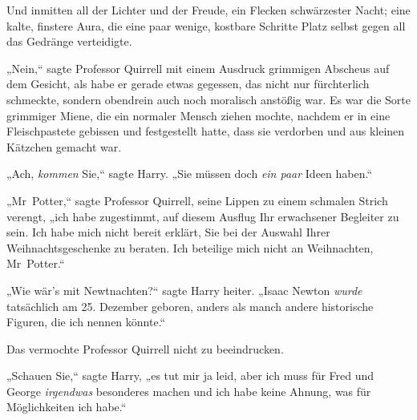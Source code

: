 Und inmitten all der Lichter und der Freude, ein Flecken schwärzester Nacht; eine kalte, finstere Aura, die eine paar wenige, kostbare Schritte Platz selbst gegen all das Gedränge verteidigte.

„Nein,“ sagte Professor Quirrell mit einem Ausdruck grimmigen Abscheus auf dem Gesicht, als habe er gerade etwas gegessen, das nicht nur fürchterlich schmeckte, sondern obendrein auch noch moralisch anstößig war. Es war die Sorte grimmiger Miene, die ein normaler Mensch ziehen mochte, nachdem er in eine Fleischpastete gebissen und festgestellt hatte, dass sie verdorben und aus kleinen Kätzchen gemacht war.

„Ach, \emph{kommen} Sie,“ sagte Harry. „Sie müssen doch \emph{ein paar} Ideen haben.“

„Mr~Potter,“ sagte Professor Quirrell, seine Lippen zu einem schmalen Strich verengt, „ich habe zugestimmt, auf diesem Ausflug Ihr erwachsener Begleiter zu sein. Ich habe mich nicht bereit erklärt, Sie bei der Auswahl Ihrer Weihnachtsgeschenke zu beraten. Ich beteilige mich nicht an Weihnachten, Mr~Potter.“

„Wie wär's mit Newtnachten?“ sagte Harry heiter. „Isaac Newton \emph{wurde} tatsächlich am 25. Dezember geboren, anders als manch andere historische Figuren, die ich nennen könnte.“

Das vermochte Professor Quirrell nicht zu beeindrucken.

„Schauen Sie,“ sagte Harry, „es tut mir ja leid, aber ich muss für Fred und George \emph{irgendwas} besonderes machen und ich habe keine Ahnung, was für Möglichkeiten ich habe.“

